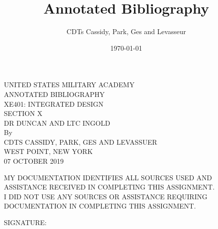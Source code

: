 \documentclass{article}
\title{Annotated Bibliography}	%
\author{CDTs Cassidy, Park, Ges and Levasseur}	%
\date{\today}
\begin{document}

\begin{titlepage}
\clearpage\thispagestyle{empty}
\begin{centering}
\vspace*{0.5in}
UNITED STATES MILITARY ACADEMY \\
\vspace{1in}
ANNOTATED BIBLIOGRAPHY \\
\vspace{1in} 
XE401: INTEGRATED DESIGN\\ 
\vspace{0.15in}
SECTION X \\
\vspace{0.15in}
DR DUNCAN AND LTC INGOLD \\
\vspace{1in}
By \\  \vspace{0.15in}
CDTS CASSIDY, PARK, GES AND LEVASSUER \\ \vspace{0.15in}
WEST POINT, NEW YORK \\ \vspace{0.15in}
07 OCTOBER 2019 \\ 
\vspace{1in}
\end{centering}
\noindent 
\underline{\hspace{0.5in}} MY DOCUMENTATION IDENTIFIES ALL SOURCES USED AND ASSISTANCE RECEIVED IN COMPLETING THIS ASSIGNMENT. \\

\noindent 
\underline{\hspace{0.5in}} I DID NOT USE ANY SOURCES OR ASSISTANCE REQUIRING DOCUMENTATION IN COMPLETING THIS ASSIGNMENT. \\ \vspace{0.5in}

\noindent
SIGNATURE: \underline{\hspace{5in}}
\end{titlepage}


\newpage
\nocite{*}
\renewcommand{\refname}{Works Cited} %
\nocite{*}


\end{document}
